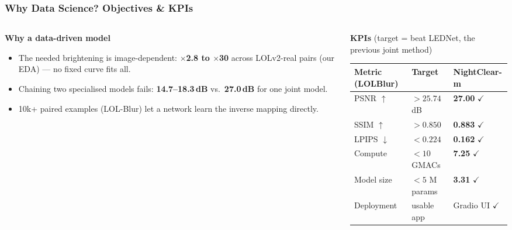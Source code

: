 \begin{frame}
    \frametitle{Why Data Science? Objectives \& KPIs}

    \begin{columns}[t]
        \begin{column}{0.47\textwidth}
            \small
            \textbf{Why a data-driven model}
            \begin{itemize}
                \item The needed brightening is image-dependent: \textbf{$\times$2.8 to $\times$30} across LOLv2-real pairs (our EDA) --- no fixed curve fits all.
                \item Chaining two specialised models fails: \textbf{14.7--18.3\,dB} vs.\ \textbf{27.0\,dB} for one joint model.
                \item 10k+ paired examples (LOL-Blur) let a network learn the inverse mapping directly.
            \end{itemize}
        \end{column}
        \begin{column}{0.51\textwidth}
            \small
            \textbf{KPIs} {\footnotesize (target = beat LEDNet, the previous joint method)}\\[1mm]
            \footnotesize
            \begin{tabular}{lll}
                \toprule
                \textbf{Metric (LOLBlur)} & \textbf{Target} & \textbf{NightClear-m} \\
                \midrule
                PSNR $\uparrow$  & $> 25.74$ dB & \textbf{27.00} $\checkmark$ \\
                SSIM $\uparrow$  & $> 0.850$    & \textbf{0.883} $\checkmark$ \\
                LPIPS $\downarrow$ & $< 0.224$  & \textbf{0.162} $\checkmark$ \\
                Compute          & $< 10$ GMACs & \textbf{7.25} $\checkmark$ \\
                Model size       & $< 5$ M params & \textbf{3.31} $\checkmark$ \\
                Deployment       & usable app   & Gradio UI $\checkmark$ \\
                \bottomrule
            \end{tabular}
        \end{column}
    \end{columns}
\end{frame}
